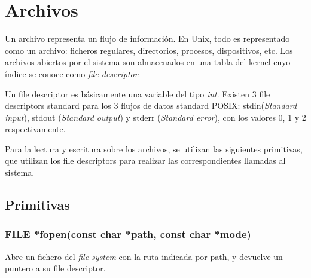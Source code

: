 \documentclass[a4paper, twoside]{article}
\newcommand{\rutapaquetes}{./paquetes-apunte}
\begin{document}
\maketitle %

\tableofcontents %


\section{Archivos}
Un archivo representa un flujo de información. En Unix, todo es representado como un archivo: ficheros regulares, directorios, procesos, dispositivos, etc.   Los archivos abiertos por el sistema son almacenados en una tabla del kernel cuyo índice se conoce como \emph{file descriptor}. 

Un file descriptor es básicamente una variable del tipo \emph{int}. Existen 3 file descriptors standard para los 3 flujos de datos standard POSIX:
stdin(\emph{Standard input}), stdout (\emph{Standard output}) y stderr (\emph{Standard error}), con los valores 0, 1 y 2 respectivamente.

Para la lectura y escritura sobre los archivos, se utilizan las siguientes primitivas, que utilizan los file descriptors para realizar las correspondientes llamadas al sistema.

\subsection{Primitivas}
\subsubsection {FILE *fopen(const char *path, const char *mode)}
Abre un fichero del \emph{file system} con la ruta indicada por path, y devuelve un puntero a su file descriptor.
\end{document}
